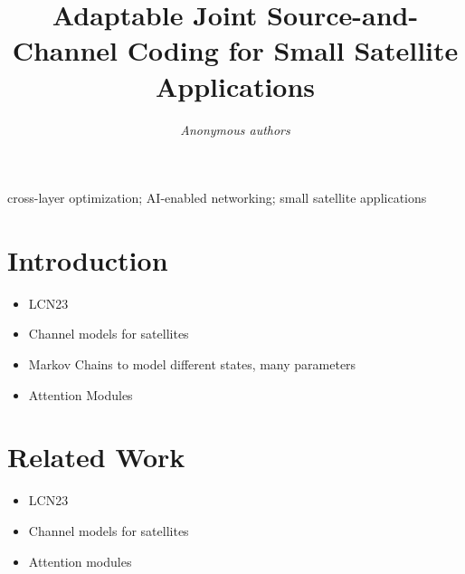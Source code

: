 \documentclass[conference]{IEEEtran}
\begin{document}
\title{Adaptable Joint Source-and-Channel Coding for Small Satellite Applications}

\author{\emph{Anonymous authors}}
\author{
\and
{}
\and
{}
}

\maketitle

\begin{abstract}

\end{abstract}

\begin{IEEEkeywords}
  cross-layer optimization; AI-enabled networking; small satellite applications
  \end{IEEEkeywords}

\acresetall
\section{Introduction}
\begin{itemize}
  \item LCN23
  \item Channel models for satellites
  \item Markov Chains to model different states, many parameters
  \item Attention Modules
\end{itemize}



\section{Related Work}
\label{sec:related_work}
\begin{itemize}
  \item LCN23
  \item Channel models for satellites
  \item Attention modules
\end{itemize}
\end{document}
